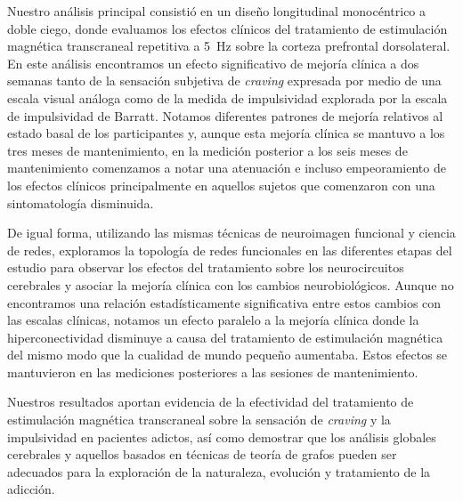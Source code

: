 Nuestro análisis principal consistió en un diseño longitudinal monocéntrico a doble ciego, donde evaluamos los efectos clínicos del tratamiento de estimulación magnética transcraneal repetitiva a \SI{5}{\hertz} sobre la corteza prefrontal dorsolateral.
En este análisis encontramos un efecto significativo de mejoría clínica a dos semanas tanto de la sensación subjetiva de \textit{craving} expresada por medio de una escala visual análoga como de la medida de impulsividad explorada por la escala de impulsividad de Barratt. Notamos diferentes patrones de mejoría relativos al estado basal de los participantes y, aunque esta mejoría clínica se mantuvo a los tres meses de mantenimiento, en la medición posterior a los seis meses de mantenimiento comenzamos a notar una atenuación e incluso empeoramiento de los efectos clínicos principalmente en aquellos sujetos que comenzaron con una sintomatología disminuida.\par
De igual forma, utilizando las mismas técnicas de neuroimagen funcional y ciencia de redes, exploramos la topología de redes funcionales en las diferentes etapas del estudio para observar los efectos del tratamiento sobre los neurocircuitos cerebrales y asociar la mejoría clínica con los cambios neurobiológicos. Aunque no encontramos una relación estadísticamente significativa entre estos cambios con las escalas clínicas, notamos un efecto paralelo a la mejoría clínica donde la hiperconectividad disminuye a causa del tratamiento de estimulación magnética del mismo modo que la cualidad de mundo pequeño aumentaba. Estos efectos se mantuvieron en las mediciones posteriores a las sesiones de mantenimiento.\par
Nuestros resultados aportan evidencia de la efectividad del tratamiento de estimulación magnética transcraneal sobre la sensación de \textit{craving} y la impulsividad en pacientes adictos, así como demostrar que los análisis globales cerebrales y aquellos basados en técnicas de teoría de grafos pueden ser adecuados para la exploración de la naturaleza, evolución y tratamiento de la adicción.
